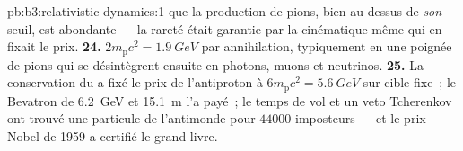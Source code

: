 \begin{solution}{pb:b3:relativistic-dynamics:1}
que la production de pions, bien au-dessus de \emph{son} seuil, est
abondante --- la rareté était garantie par la cinématique même qui en
fixait le prix.
\textbf{24.} $2m_{\text{p}}c^2 = \qty{1.9}{GeV}$ par annihilation,
typiquement en une poignée de pions qui se désintègrent ensuite en
photons, muons et neutrinos.
\textbf{25.} La conservation du  a fixé
le prix de l'antiproton à $6m_{\text{p}}c^2 = \qty{5.6}{GeV}$ sur cible
fixe~; le Bevatron de \qty{6.2}{GeV} et \qty{15.1}{m} l'a payé~; le
temps de vol et un veto Tcherenkov ont trouvé une particule de
l'antimonde pour $44000$ imposteurs --- et le prix Nobel de 1959 a
certifié le grand livre.
\end{solution}
